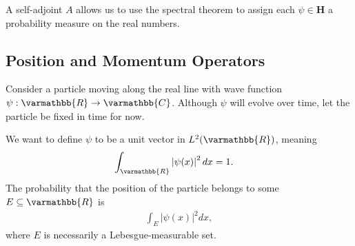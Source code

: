 \documentclass[12pt]{extarticle}
\newcommand{\R}{\varmathbb{R}}
\newcommand{\C}{\varmathbb{C}}
\theoremstyle{plain}
\theoremstyle{definition}
\theoremstyle{remark}
\renewcommand{\newline}{\hfill\break}
\begin{document}
  A self-adjoint $A$ allows us to use the spectral theorem to assign each $\psi \in \mathbf{H}$ a probability measure on the real numbers.
  \subsection{Position and Momentum Operators}%
  Consider a particle moving along the real line with wave function $\psi: \R\rightarrow \C$. Although $\psi$ will evolve over time, let the particle be fixed in time for now.\newline

  We want to define $\psi$ to be a unit vector in $L^{2}(\R)$, meaning
  \begin{align*}
    \int_{\R}\left\vert \psi(x) \right\vert^2dx &= 1.
  \end{align*}
  The probability that the position of the particle belongs to some $E\subseteq \R$ is
  \begin{align*}
    \int_{E}\left\vert \psi(x) \right\vert^2dx,
  \end{align*}
  where $E$ is necessarily a Lebesgue-measurable set.\newline
\end{document}
